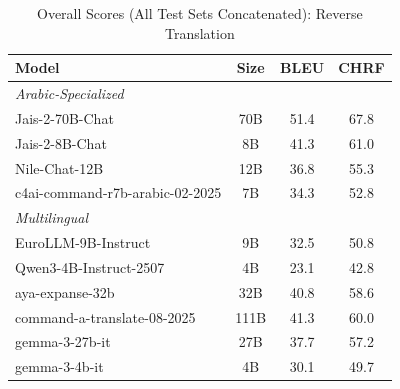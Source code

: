 \begin{table}[htbp]
\centering
\caption{Overall Scores (All Test Sets Concatenated): Reverse Translation}
\label{tab:overall_scores_reverse}
\begin{tabular}{l@{\hspace{3pt}}c@{\hspace{3pt}}c@{\hspace{3pt}}c}
\toprule
Model & Size & BLEU & CHRF \\
\midrule
\multicolumn{4}{l}{\textit{Arabic-Specialized}} \\
\midrule
Jais-2-70B-Chat & 70B & 51.4 & 67.8 \\
Jais-2-8B-Chat & 8B & 41.3 & 61.0 \\
Nile-Chat-12B & 12B & 36.8 & 55.3 \\
c4ai-command-r7b-arabic-02-2025 & 7B & 34.3 & 52.8 \\
\midrule
\multicolumn{4}{l}{\textit{Multilingual}} \\
\midrule
EuroLLM-9B-Instruct & 9B & 32.5 & 50.8 \\
Qwen3-4B-Instruct-2507 & 4B & 23.1 & 42.8 \\
aya-expanse-32b & 32B & 40.8 & 58.6 \\
command-a-translate-08-2025 & 111B & 41.3 & 60.0 \\
gemma-3-27b-it & 27B & 37.7 & 57.2 \\
gemma-3-4b-it & 4B & 30.1 & 49.7 \\
\midrule
\bottomrule
\end{tabular}
\end{table}